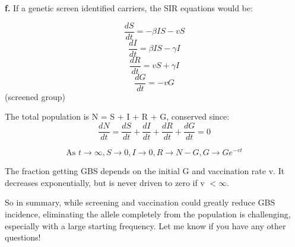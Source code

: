 \documentclass{article}
\begin{document}
\textbf{f.} If a genetic screen identified carriers, the SIR equations would be:

$$\frac{dS}{dt} = -\beta IS - vS$$
$$\frac{dI}{dt} = \beta IS - \gamma I$$
$$\frac{dR}{dt} = vS + \gamma I$$
$$\frac{dG}{dt} = -vG$$ (screened group)

The total population is N = S + I + R + G, conserved since:
$$\frac{dN}{dt} = \frac{dS}{dt} + \frac{dI}{dt} + \frac{dR}{dt} + \frac{dG}{dt} = 0$$

\[
\text{As } t \rightarrow \infty, S \rightarrow 0, I \rightarrow 0, R \rightarrow N-G, G \rightarrow Ge^{-vt}
\]


The fraction getting GBS depends on the initial G and vaccination rate v. It decreases exponentially, but is never driven to zero if v  $< \infty$.

So in summary, while screening and vaccination could greatly reduce GBS incidence, eliminating the allele completely from the population is challenging, especially with a large starting frequency. Let me know if you have any other questions!
\end{document}
